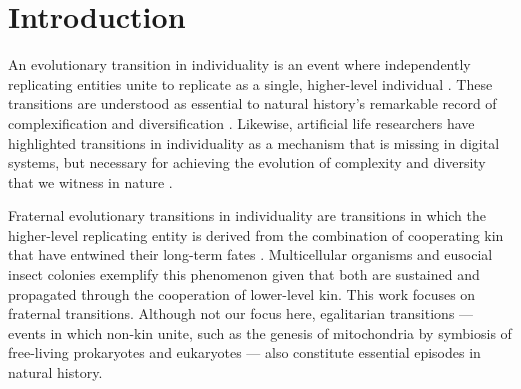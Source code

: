 \section{Introduction}

An evolutionary transition in individuality is an event where independently replicating entities unite to replicate as a single, higher-level individual \citep{smith1997major}.
These transitions are understood as essential to natural history's remarkable record of complexification and diversification \citep{smith1997major}.
Likewise, artificial life researchers have highlighted transitions in individuality as a mechanism that is missing in digital systems, but necessary for achieving the evolution of complexity and diversity that we witness in nature \citep{taylor2016open, banzhaf2016defining}.

Fraternal evolutionary transitions in individuality are transitions in which the higher-level replicating entity is derived from the combination of cooperating kin that have entwined their long-term fates \citep{west2015major}.
Multicellular organisms and eusocial insect colonies exemplify this phenomenon \citep{smith1997major} given that both are sustained and propagated through the cooperation of lower-level kin.
This work focuses on fraternal transitions.
Although not our focus here, egalitarian transitions --- events in which non-kin unite, such as the genesis of mitochondria by symbiosis of free-living prokaryotes and eukaryotes \citep{smith1997major} --- also constitute essential episodes in natural history.

